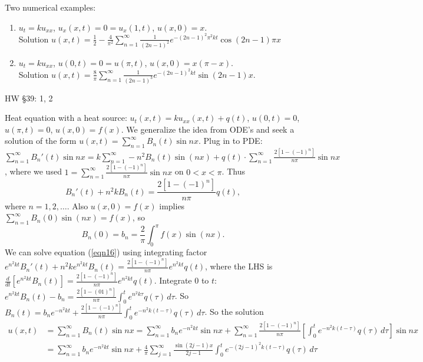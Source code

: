 \documentclass[]{article}
\begin{document}
\begin{example}
	Two numerical examples:
	\begin{enumerate}
		\item $u_t = ku_{xx}$, $u_x(x,t) = 0 = u_x(1,t)$, $u(x,0)=x$. \\Solution $u(x,t) = \frac{1}{2} - \frac{4}{\pi^2} \sum_{n=1}^\infty \frac{1}{(2n-1)^2} e^{-(2n-1)^2\pi^2 kt} \cos{(2n-1)\pi x}$
		\item $u_t = ku_{xx}$, $u(0,t) = 0 = u(\pi,t)$, $u(x,0) = x(\pi-x)$. \\Solution $u(x,t) = \frac{8}{\pi} \sum_{n=1}^\infty \frac{1}{(2n-1)^3} e^{-(2n-1)^2 kt} \sin{(2n-1)x}$.
	\end{enumerate}
\end{example}
HW \S39: 1, 2

\begin{example}
	Heat equation with a heat source:
	$u_t(x,t) = ku_{xx}(x,t) + q(t)$, $u(0,t) = 0$, $u(\pi,t) = 0$, $u(x,0)=f(x)$.
	We generalize the  idea from ODE's and seek a solution of the form $u(x,t) = \sum_{n=1}^\infty B_n(t) \sin{nx}$.
	Plug in to PDE: $\sum_{n=1}^\infty B_n'(t) \sin{nx} = k \sum_{n=1}^\infty -n^2 B_n(t) \sin{(nx)} + q(t) \cdot \sum_{n=1}^\infty \frac{2[1-(-1)^n]}{n\pi} \sin{nx}$, where we used $ 1= \sum_{n=1}^\infty \frac{2[1-(-1)^n]}{n\pi} \sin{nx}$ on $0<x<\pi$.
	Thus \begin{equation}
		B_n'(t) + n^2kB_n(t) = \frac{2[1-(-1)^n]}{n\pi}q(t),
		\label{eqn16}
	\end{equation} where $n=1,2,\dots$.
	Also $u(x,0) = f(x)$ implies $\sum_{n=1}^\infty B_n(0) \sin{(nx)} = f(x)$, so $$B_n(0) = b_n = \frac{2}{\pi} \int_0^\pi f(x) \sin{(nx)}.$$
	We can solve equation (\ref{eqn16}) using integrating factor $e^{n^2kt} B_n'(t) + n^2ke^{n^2kt} B_n(t) = \frac{2[1-(-1)^n]}{n\pi}e^{n^2kt} q(t)$, where the LHS is $\frac{d}{dt} \left[ e^{n^2kt} B_n(t) \right] = \frac{2[1-(-1)^n]}{n\pi} e^{n^2kt} q(t)$. Integrate 0 to $t$: $e^{n^2kt} B_n(t) - b_n = \frac{2[1-(01)^n]}{n\pi} \int_0^t e^{n^2k\tau} q(\tau) \, d\tau$. So $B_n(t) = b_n e^{-n^2kt} + \frac{2[1-(-1)^n]}{n\pi} \int_0^t e^{-n^2k(t-\tau)}q(\tau) \, d\tau$.
	So the solution 
	\begin{align*}
		u(x,t) &= \sum_{n=1}^\infty B_n(t) \sin{nx} = \sum_{n=1}^\infty b_n e^{-n^2kt} \sin{nx} + \sum_{n=1}^\infty \frac{2[1-(-1)^n]}{n\pi} \left[ \int_0^t e^{-n^2k(t-\tau)} q(\tau) \, d\tau \right] \sin{nx} \\
		&=\sum_{n=1}^\infty b_n e^{-n^2kt} \sin{nx} + \frac{4}{\pi} \sum_{j=1}^\infty \frac{\sin{(2j-1)x}}{2j-1} \int_0^t e^{-(2j-1)^2k(t-\tau)} q(\tau) \, d\tau
	\end{align*}
\end{example}
\end{document}
